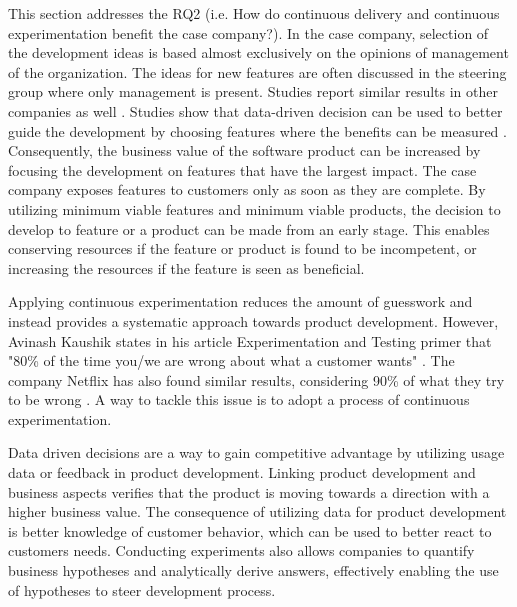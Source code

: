 \documentclass[english, grading]{tktltiki2}
\theoremstyle{definition}
\theoremstyle{remark}
\begin{document}
This section addresses the RQ2 (i.e. How do continuous delivery and continuous experimentation benefit the case company?). In the case company, selection of the development ideas is based almost exclusively on the opinions of management of the organization. The ideas for new features are often discussed in the steering group where only management is present. Studies report similar results in other companies as well \cite{kohavi2007practical}. Studies show that data-driven decision can be used to better guide the development by choosing features where the benefits can be measured \cite{kohavi2007practical, moran2007wrong, kaushik}. Consequently, the business value of the software product can be increased by focusing the development on features that have the largest impact. The case company exposes features to customers only as soon as they are complete. By utilizing minimum viable features and minimum viable products, the decision to develop to feature or a product can be made from an early stage. This enables conserving resources if the feature or product is found to be incompetent, or increasing the resources if the feature is seen as beneficial. 

Applying continuous experimentation reduces the amount of guesswork and instead provides a systematic approach towards product development. However, Avinash Kaushik states in his article Experimentation and Testing primer that "80\% of the time you/we are wrong about what a customer wants" \cite{kaushik}. The company Netflix has also found similar results, considering 90\% of what they try to be wrong \cite{moran2007wrong}. A way to tackle this issue is to adopt a process of continuous experimentation.

Data driven decisions are a way to gain competitive advantage by utilizing usage data or feedback in product development. Linking product development and business aspects verifies that the product is moving towards a direction with a higher business value. The consequence of utilizing data for product development is better knowledge of customer behavior, which can be used to better react to customers needs. Conducting experiments also allows companies to quantify business hypotheses and analytically derive answers, effectively enabling the use of hypotheses to steer development process.
\end{document}
